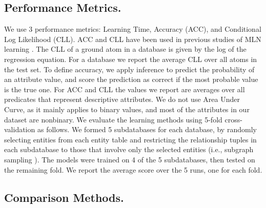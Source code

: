 \documentclass[twoside,leqno,twocolumn]{article}
\begin{document}
\subsection{Performance Metrics.}
We use 3 performance metrics: %
Learning Time, Accuracy (ACC), and Conditional Log Likelihood (CLL). ACC and CLL have been used in previous studies of MLN learning  \cite{Kok2009,Schulte2012}. The CLL of a ground atom in a database is given by the log of the regression equation. For a database we report the average CLL over all atoms in the test set. To define accuracy, we apply inference to predict the probability of an attribute value, and score the prediction as correct if the most probable value is the true one. For ACC and CLL the values we report are averages over all predicates that represent descriptive attributes.
We do not use Area Under Curve, as it mainly applies to binary values, and most of the attributes in our dataset are nonbinary. 
We evaluate the learning methods using 5-fold cross-validation as follows. We formed 5 subdatabases for each database, by randomly selecting entities from each entity table and restricting the relationship tuples in each subdatabase to those that involve only the selected entities  (i.e., subgraph sampling \cite{Frank1977,Schulte2012}). The models were trained on 4 of the 5 subdatabases, then tested on the remaining fold. We report the  average score over the 5 runs, one for each fold. 

\subsection{Comparison Methods.}
%
\end{document}
